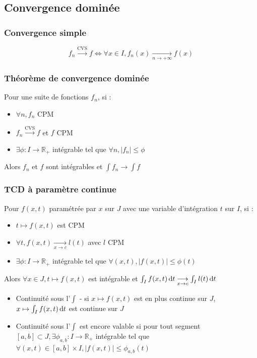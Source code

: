 \documentclass[openany]{book}
\begin{document}
\subsection{Convergence dominée}

\subsubsection{Convergence simple}
\[ f_n \overset{\text{CVS}}{\longrightarrow} f \iff \forall x \in I, f_n(x) \underset{n \rightarrow +\infty}{\longrightarrow} f(x) \]

\subsubsection{Théorème de convergence dominée}
Pour une suite de fonctions $f_n$, si :
\begin{itemize}
    \item $\forall n, f_n$ CPM
    \item $f_n \overset{\text{CVS}}{\longrightarrow} f$ et $f$ CPM 
    \item $\exists \phi : I \rightarrow \mathbb{R}_+$ intégrable tel que $\forall n, |f_n| \leq \phi$
\end{itemize}

Alors $f_n$ et $f$ sont intégrables et $\int f_n \longrightarrow \int f$

\subsubsection{TCD à paramètre continue}
Pour $f(x, t)$ paramétrée par $x$ sur $J$ avec une variable d'intégration $t$ sur $I$, si :
\begin{itemize}
    \item $t \mapsto f(x, t)$ est CPM
    \item $\forall t, f(x, t) \underset{x\rightarrow c}{\longrightarrow} l(t)$ avec $l$ CPM
    \item $\exists \phi : I \rightarrow \mathbb{R}_+$ intégrable tel que $\forall (x, t), |f(x, t)| \leq \phi(t)$
\end{itemize}

Alors $\forall x \in J, t \mapsto f(x, t)$ est intégrable et $\int_{I} f(x, t) \, \text{d}t \underset{x \rightarrow c}{\longrightarrow} \int_I l(t) \, \text{d}t$

\begin{itemize}
    \item Continuité sous l'$\int$ - si $x \mapsto f(x, t)$ est en plus continue sur $J$, $x \mapsto \int_{I} f(x, t) \, \text{d}t $ est continue sur $J$
    \item Continuité sous l'$\int$ est encore valable si pour tout segment $[a, b] \subset J, \exists \phi_{a, b} : I \rightarrow \mathbb{R}_+$ intégrable tel que $\forall (x, t) \in [a, b] \times I, |f(x, t)| \leq \phi_{a, b}(t)$
\end{itemize}
\end{document}
